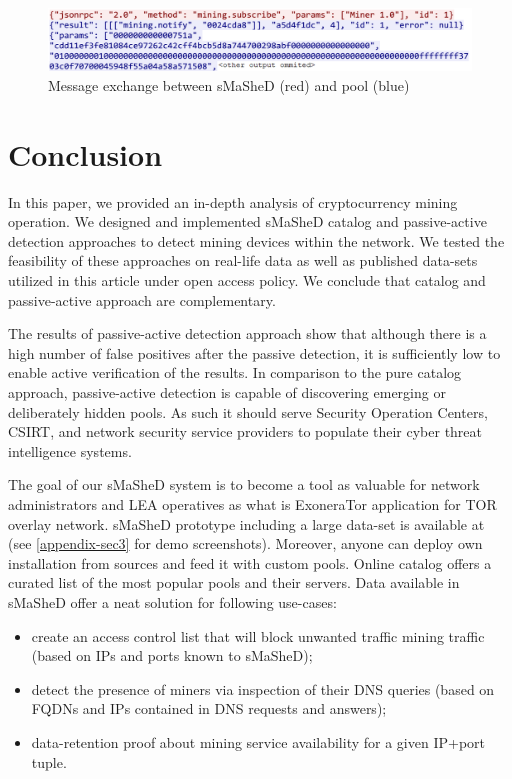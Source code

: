 \documentclass[preprint,12pt,3p]{elsarticle}
\begin{document}
\begin{figure}[tp]
    \centering
    \includegraphics[width=\textwidth]{wshark-smashed.png}
    \caption{Message exchange between sMaSheD (red) and pool (blue)}
    \label{fig:wshark-smashed}
\end{figure}


\section{Conclusion}
\label{sec6}

In this paper, we provided an in-depth analysis of cryptocurrency mining operation. We designed and implemented sMaSheD catalog and passive-active detection approaches to detect mining devices within the network. We tested the feasibility of these approaches on real-life data as well as published data-sets utilized in this article under open access policy. We conclude that catalog and passive-active approach are complementary. 

The results of passive-active detection approach show that although there is a high number of false positives after the passive detection, it is sufficiently low to enable active verification of the results. In comparison to the pure catalog approach, passive-active detection is capable of discovering emerging or deliberately hidden pools. As such it should serve Security Operation Centers, CSIRT, and network security service providers to populate their cyber threat intelligence systems.

The goal of our sMaSheD system is to become a tool as valuable for network administrators and LEA operatives as what is ExoneraTor \cite{EXONERA} application for TOR overlay network. sMaSheD prototype including a large data-set is available at \cite{WWW-SMASHED} (see \ref{appendix-sec3} for demo screenshots). Moreover, anyone can deploy own installation from sources \cite{GITHUB-SMASHED} and feed it with custom pools. Online catalog offers a curated list of the most popular pools and their servers. Data available in sMaSheD offer a neat solution for following use-cases:

\begin{itemize}
    \item create an access control list that will block unwanted traffic mining traffic (based on IPs and ports known to sMaSheD);
    \item detect the presence of miners via inspection of their DNS queries (based on FQDNs and IPs contained in DNS requests and answers);
    \item data-retention proof about mining service availability for a given IP+port tuple.
\end{itemize}
\end{document}
